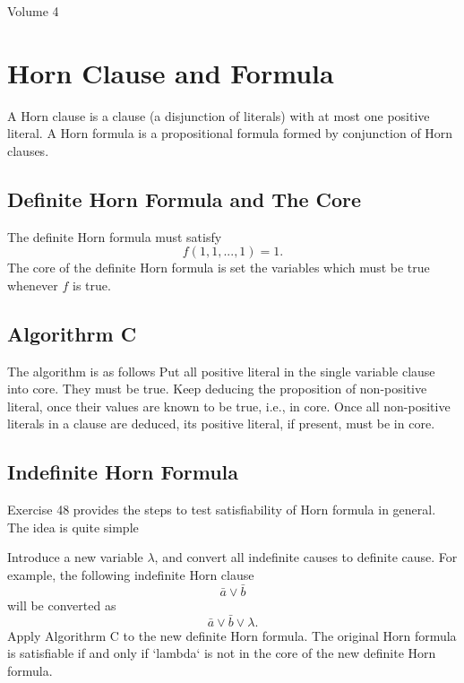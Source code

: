 

\notespagesize
%
Volume 4
%
\section{Horn Clause and Formula}

A Horn clause is a clause (a disjunction of literals) with at most one positive
literal.  A Horn formula is a propositional formula formed by conjunction of
Horn clauses.

\subsection{Definite Horn Formula and The Core}
The definite Horn formula
must satisfy
$$
f(1, 1, ..., 1) = 1.
$$
The core of the definite Horn formula is set the variables which must be true
whenever $f$ is true.

\subsection{Algorithrm C}

The algorithm is as follows
\numberedlist
\li Put all positive literal in the single variable clause into core.  They must
    be true.
\li Keep deducing the proposition of non-positive literal, once their values
    are known to be true, i.e., in core. Once all non-positive literals in a
    clause are deduced, its positive literal, if present, must be in core.
\endnumberedlist

\subsection{Indefinite Horn Formula}

Exercise 48 provides the steps to test satisfiability of Horn formula in
general. The idea is quite simple

\numberedlist
\li Introduce a new variable $\lambda$, and convert all indefinite
causes to definite cause. For example, the following indefinite Horn clause
$$
\bar a \vee \bar b  %
$$
will be converted as
$$
\bar a \vee \bar b \vee \lambda.
$$
\li Apply Algorithrm C to the new definite Horn formula. The original
Horn formula is satisfiable if and only if `lambda` is not in the core of the
new definite Horn formula.
\endnumberedlist

\bye
